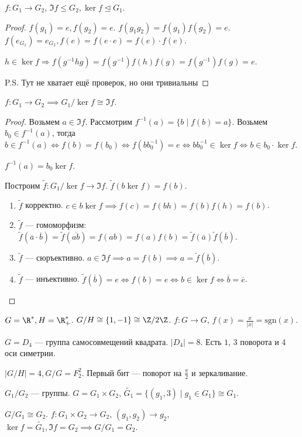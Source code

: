 \begin{lemma}
    $f\!: G_1 \to G_2$, $\Im f \le G_2, \ker f \trianglelefteq G_1$.
\end{lemma}
\begin{proof}
    $f(g_1) = e, f(g_2) = e$. $f(g_1g_2) = f(g_1)f(g_2) = e$.
    $f(e_{G_1}) = e_{G_2}, f(e) = f(e \cdot e) = f(e) \cdot f(e)$.

    $h \in \ker f \Rightarrow f(g^{-1}hg) = f(g^{-1}) f(h)f(g) = f(g^{-1}) f(g) = e$.

    P.S. Тут не хватает ещё проверок, но они тривиальны
\end{proof}
\begin{theorem}
    $f\!: G_1 \to G_2 \implies G_1 / \ker f \cong \Im f$.
\end{theorem}
\begin{proof}
    Возьмем $a \in \Im f$. Рассмотрим  $f^{-1}(a) = \{b \mid f(b) = a\}$. Возьмем $b_0 \in f^{-1}(a)$, тогда  $b \in f^{-1}(a) \iff f(b) = f(b_0) \iff f(bb_0^{-1}) = e \iff bb_0^{-1} \in \ker f \iff b \in b_0 \cdot \ker f$.

    $f^{-1}(a) = b_0 \ker f$.

    Построим  $\widetilde{f}\!: G_1 / \ker f  \to \Im f$. $\widetilde{f}(b \ker f) = f(b)$.
    \begin{enumerate}
         \item $\widetilde{f}$ корректно.  $c \in b \ker f \implies f(c) = f(bh) = f(b) f(h) = f(b)$.
         \item $\widetilde{f}$ --- гомоморфизм:  $\widetilde{f}(\overline{a} \cdot \overline{b}) = \widetilde{f}(\overline{ab}) = f(ab) = f(a)f(b) = \widetilde{f}(\overline{a}) \widetilde{f}(\overline{b})$.
         \item  $\widetilde{f}$ --- сюръективно.  $a \in \Im f \implies a = f(b) \implies a = \widetilde{f}(\overline{b})$.
         \item  $\widetilde{f}$ --- инъективно.  $\widetilde{f}(\overline{b}) = e \iff f(b) = e \iff b \in \ker f \iff \overline{b} = \overline{e}$.
    \end{enumerate}
\end{proof}
\begin{example}
    $G = \R^*, H = \R_+^*$.  $G / H \cong \{1, -1\} \cong \Z / 2\Z$.
     $f\!: G \to G$,  $f(x) = \frac{x}{|x|} = \text{sgn}(x)$.
\end{example}
\begin{example}
    $G = D_4$ --- группа самосовмещений квадрата. $|D_4| = 8$. Есть $1$, 3 поворота и 4 оси симетрии.

     $|G / H| = 4, G / G = F_2^2$. Первый бит --- поворот на $\frac{\pi}{2}$ и зеркаливание.
\end{example}
\begin{example}
    $G_1 / G_2$ --- группы. $G = G_1 \times G_2$, $\widetilde{G_1} = \{ (g_1, 3) \mid g_1 \in G_1 \} \cong G_1$.

    $G / G_1 \cong G_2$. $f\!: G_1 \times G_2 \to G_2$, $(g_1, g_2) \to g_2$, $\ker f = \widetilde{G_1}, \Im f = G_2 \implies G / G_1 = G_2$.
\end{example}

